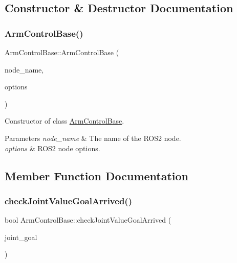\subsection{Constructor \& Destructor Documentation}
\mbox{\label{classArmControlBase_a5e5d5e6aaf2cf2957266353630f528fa}} 
\subsubsection{\texorpdfstring{Arm\+Control\+Base()}{ArmControlBase()}}
{\footnotesize\ttfamily Arm\+Control\+Base\+::\+Arm\+Control\+Base (\begin{DoxyParamCaption}\item[{const std\+::string}]{node\+\_\+name,  }\item[{const rclcpp\+::\+Node\+Options \&}]{options }\end{DoxyParamCaption})\hspace{0.3cm}{\ttfamily [inline]}}



Constructor of class \hyperlink{classArmControlBase}{Arm\+Control\+Base}. 


\begin{DoxyParams}{Parameters}
{\em node\+\_\+name} & The name of the R\+O\+S2 node. \\
\hline
{\em options} & R\+O\+S2 node options. \\
\hline
\end{DoxyParams}


\subsection{Member Function Documentation}
\mbox{\label{classArmControlBase_a3e695dc1f5d026fd81860f7d9d01c53b}} 
\subsubsection{\texorpdfstring{check\+Joint\+Value\+Goal\+Arrived()}{checkJointValueGoalArrived()}}
{\footnotesize\ttfamily bool Arm\+Control\+Base\+::check\+Joint\+Value\+Goal\+Arrived (\begin{DoxyParamCaption}\item[{const std\+::vector$<$ double $>$ \&}]{joint\+\_\+goal }\end{DoxyParamCaption})\hspace{0.3cm}{\ttfamily [virtual]}}



